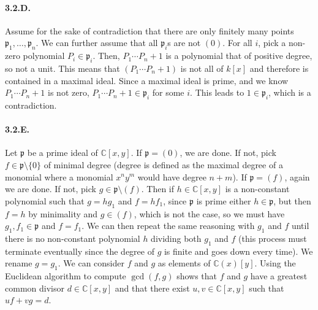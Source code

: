 \documentclass{article}
\newcommand{\C}{\mathbb{C}}
\newcommand{\p}{\mathfrak{p}}
\begin{document}
\paragraph{3.2.D.} Assume for the sake of contradiction that there are only finitely many points $\p_1, \dots, \p_n$. We can further assume that all $\p_i$s are not $(0)$. For all $i$, pick a non-zero polynomial $P_i \in \p_i$. Then, $P_1 \cdots P_n + 1$ is a polynomial that of positive degree, so not a unit. This means that $(P_1 \cdots P_n + 1)$ is not all of $k[x]$ and therefore is contained in a maximal ideal. Since a maximal ideal is prime, and we know $P_1 \cdots P_n + 1$ is not zero, $P_1 \cdots P_n + 1 \in \p_i$ for some $i$. This leads to $1 \in \p_i$, which is a contradiction.

\paragraph{3.2.E.} Let $\p$ be a prime ideal of $\C[x,y]$. If $\p = (0)$, we are done. If not, pick $f \in \p \setminus \{0\}$ of minimal degree (degree is defined as the maximal degree of a monomial where a monomial $x^n y^m$ would have degree $n+m$). If $\p = (f)$, again we are done. If not, pick $g \in \p\setminus (f)$. Then if $h \in \C[x,y]$ is a non-constant polynomial such that $g = hg_1$ and $f = hf_1$, since $\p$ is prime either $h \in \p$, but then $f = h$ by minimality and $g \in (f)$, which is not the case, so we must have $g_1, f_1 \in \p$ and $f = f_1$. We can then repeat the same reasoning with $g_1$ and $f$ until there is no non-constant polynomial $h$ dividing both $g_1$ and $f$ (this process must terminate eventually since the degree of $g$ is finite and goes down every time). We rename $g = g_1$. We can consider $f$ and $g$ as elements of $\C(x)[y]$. Using the Euclidean algorithm to compute $\gcd(f,g)$ shows that $f$ and $g$ have a greatest common divisor $d \in \C[x,y]$ and that there exist $u,v \in \C[x,y]$ such that $uf + vg = d$.
\end{document}

